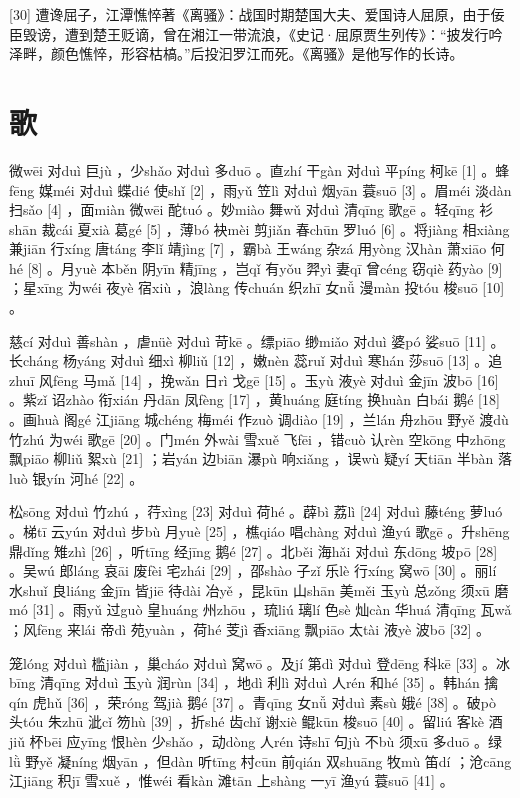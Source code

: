 \documentclass[12pt,UTF8]{ctexbook}
\begin{document}
[30] 遭谗屈子，江潭憔悴著《离骚》：战国时期楚国大夫、爱国诗人屈原，由于佞臣毁谤，遭到楚王贬谪，曾在湘江一带流浪，《史记·屈原贾生列传》：“披发行吟泽畔，颜色憔悴，形容枯槁。”后投汩罗江而死。《离骚》是他写作的长诗。





\chapter{歌}


微wēi 对duì 巨jù ，少shǎo 对duì 多duō 。直zhí 干gàn 对duì 平píng 柯kē [1] 。蜂fēng 媒méi 对duì 蝶dié 使shǐ [2] ，雨yǔ 笠lì 对duì 烟yān 蓑suō [3] 。眉méi 淡dàn 扫sǎo [4] ，面miàn 微wēi 酡tuó 。妙miào 舞wǔ 对duì 清qīng 歌gē 。轻qīng 衫shān 裁cái 夏xià 葛gé [5] ，薄bó 袂mèi 剪jiǎn 春chūn 罗luó [6] 。将jiàng 相xiàng 兼jiān 行xíng 唐táng 李lǐ 靖jìng [7] ，霸bà 王wáng 杂zá 用yòng 汉hàn 萧xiāo 何hé [8] 。月yuè 本běn 阴yīn 精jīng ，岂qǐ 有yǒu 羿yì 妻qī 曾céng 窃qiè 药yào [9] ；星xīng 为wéi 夜yè 宿xiù ，浪làng 传chuán 织zhī 女nǚ 漫màn 投tóu 梭suō [10] 。

慈cí 对duì 善shàn ，虐nüè 对duì 苛kē 。缥piāo 缈miǎo 对duì 婆pó 娑suō [11] 。长cháng 杨yáng 对duì 细xì 柳liǔ [12] ，嫩nèn 蕊ruǐ 对duì 寒hán 莎suō [13] 。追zhuī 风fēng 马mǎ [14] ，挽wǎn 日rì 戈gē [15] 。玉yù 液yè 对duì 金jīn 波bō [16] 。紫zǐ 诏zhào 衔xián 丹dān 凤fèng [17] ，黄huáng 庭tíng 换huàn 白bái 鹅é [18] 。画huà 阁gé 江jiāng 城chéng 梅méi 作zuò 调diào [19] ，兰lán 舟zhōu 野yě 渡dù 竹zhú 为wéi 歌gē [20] 。门mén 外wài 雪xuě 飞fēi ，错cuò 认rèn 空kōng 中zhōng 飘piāo 柳liǔ 絮xù [21] ；岩yán 边biān 瀑pù 响xiǎng ，误wù 疑yí 天tiān 半bàn 落luò 银yín 河hé [22] 。

松sōng 对duì 竹zhú ，荇xìng [23] 对duì 荷hé 。薜bì 荔lì [24] 对duì 藤téng 萝luó 。梯tī 云yún 对duì 步bù 月yuè [25] ，樵qiáo 唱chàng 对duì 渔yú 歌gē 。升shēng 鼎dǐng 雉zhì [26] ，听tīng 经jīng 鹅é [27] 。北běi 海hǎi 对duì 东dōng 坡pō [28] 。吴wú 郎láng 哀āi 废fèi 宅zhái [29] ，邵shào 子zǐ 乐lè 行xíng 窝wō [30] 。丽lí 水shuǐ 良liáng 金jīn 皆jiē 待dài 冶yě ，昆kūn 山shān 美měi 玉yù 总zǒng 须xū 磨mó [31] 。雨yǔ 过guò 皇huáng 州zhōu ，琉liú 璃lí 色sè 灿càn 华huá 清qīng 瓦wǎ ；风fēng 来lái 帝dì 苑yuàn ，荷hé 芰jì 香xiāng 飘piāo 太tài 液yè 波bō [32] 。

笼lóng 对duì 槛jiàn ，巢cháo 对duì 窝wō 。及jí 第dì 对duì 登dēng 科kē [33] 。冰bīng 清qīng 对duì 玉yù 润rùn [34] ，地dì 利lì 对duì 人rén 和hé [35] 。韩hán 擒qín 虎hǔ [36] ，荣róng 驾jià 鹅é [37] 。青qīng 女nǚ 对duì 素sù 娥é [38] 。破pò 头tóu 朱zhū 泚cǐ 笏hù [39] ，折shé 齿chǐ 谢xiè 鲲kūn 梭suō [40] 。留liú 客kè 酒jiǔ 杯bēi 应yīng 恨hèn 少shǎo ，动dòng 人rén 诗shī 句jù 不bù 须xū 多duō 。绿lǜ 野yě 凝níng 烟yān ，但dàn 听tīng 村cūn 前qián 双shuāng 牧mù 笛dí ；沧cāng 江jiāng 积jī 雪xuě ，惟wéi 看kàn 滩tān 上shàng 一yī 渔yú 蓑suō [41] 。
\end{document}
